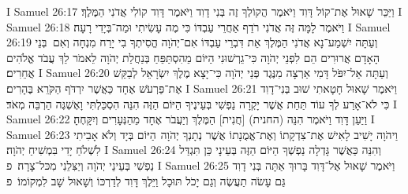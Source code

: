 I Samuel 26:17	וַיַּכֵּר שָׁאוּל אֶת־קוֹל דָּוִד וַיֹּאמֶר הֲקוֹלְךָ זֶה בְּנִי דָוִד וַיֹּאמֶר דָּוִד קוֹלִי אֲדֹנִי הַמֶּלֶךְ׃
I Samuel 26:18	וַיֹּאמֶר לָמָּה זֶּה אֲדֹנִי רֹדֵף אַחֲרֵי עַבְדּוֹ כִּי מֶה עָשִׂיתִי וּמַה־בְּיָדִי רָעָה׃
I Samuel 26:19	וְעַתָּה יִשְׁמַע־נָא אֲדֹנִי הַמֶּלֶךְ אֵת דִּבְרֵי עַבְדּוֹ אִם־יְהֹוָה הֱסִיתְךָ בִי יָרַח מִנְחָה וְאִם  בְּנֵי הָאָדָם אֲרוּרִים הֵם לִפְנֵי יְהֹוָה כִּי־גֵרְשׁוּנִי הַיּוֹם מֵהִסְתַּפֵּחַ בְּנַחֲלַת יְהֹוָה לֵאמֹר לֵךְ עֲבֹד אֱלֹהִים אֲחֵרִים׃
I Samuel 26:20	וְעַתָּה אַל־יִפֹּל דָּמִי אַרְצָה מִנֶּגֶד פְּנֵי יְהֹוָה כִּי־יָצָא מֶלֶךְ יִשְׂרָאֵל לְבַקֵּשׁ אֶת־פַּרְעֹשׁ אֶחָד כַּאֲשֶׁר יִרְדֹּף הַקֹּרֵא בֶּהָרִים׃
I Samuel 26:21	וַיֹּאמֶר שָׁאוּל חָטָאתִי שׁוּב בְּנִי־דָוִד כִּי לֹא־אָרַע לְךָ עוֹד תַּחַת אֲשֶׁר יָקְרָה נַפְשִׁי בְּעֵינֶיךָ הַיּוֹם הַזֶּה הִנֵּה הִסְכַּלְתִּי וָאֶשְׁגֶּה הַרְבֵּה מְאֹד׃
I Samuel 26:22	וַיַּעַן דָּוִד וַיֹּאמֶר הִנֵּה (החנית) [חֲנִית] הַמֶּלֶךְ וְיַעֲבֹר אֶחָד מֵהַנְּעָרִים וְיִקָּחֶהָ׃
I Samuel 26:23	וַיהֹוָה יָשִׁיב לָאִישׁ אֶת־צִדְקָתוֹ וְאֶת־אֱמֻנָתוֹ אֲשֶׁר נְתָנְךָ יְהֹוָה  הַיּוֹם בְּיָד וְלֹא אָבִיתִי לִשְׁלֹחַ יָדִי בִּמְשִׁיחַ יְהֹוָה׃
I Samuel 26:24	וְהִנֵּה כַּאֲשֶׁר גָּדְלָה נַפְשְׁךָ הַיּוֹם הַזֶּה בְּעֵינָי כֵּן תִּגְדַּל נַפְשִׁי בְּעֵינֵי יְהֹוָה וְיַצִּלֵנִי מִכּל־צָרָה׃ {פ}
I Samuel 26:25	וַיֹּאמֶר שָׁאוּל אֶל־דָּוִד בָּרוּךְ אַתָּה בְּנִי דָוִד גַּם עָשֹׂה תַעֲשֶׂה וְגַם יָכֹל תּוּכָל וַיֵּלֶךְ דָּוִד לְדַרְכּוֹ וְשָׁאוּל שָׁב לִמְקוֹמוֹ׃ {פ}
